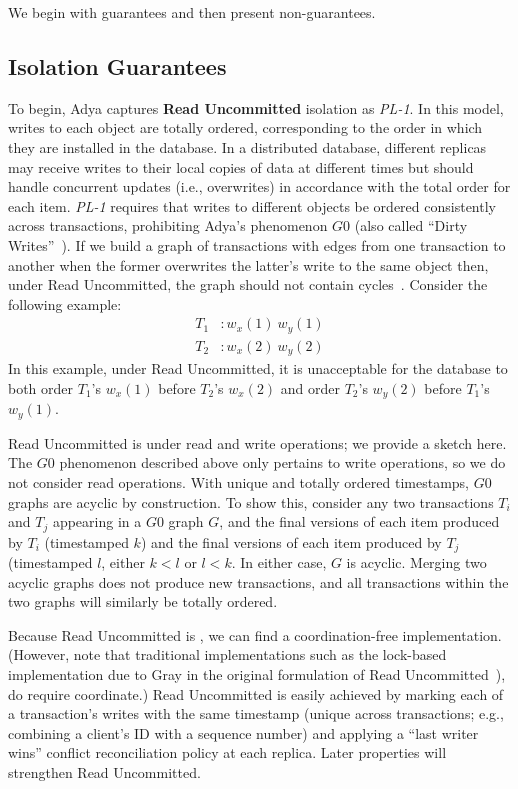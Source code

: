 We begin with \iconfluent guarantees and then present non-\iconfluent guarantees.

\subsection{\IConfluent Isolation Guarantees}
\label{sec:isolation}

To begin, Adya captures \textbf{Read Uncommitted} isolation as
\textit{PL-1}. In this model, writes to each object are totally
ordered, corresponding to the order in which they are installed in the
database. In a distributed database, different replicas may receive
writes to their local copies of data at different times but should
handle concurrent updates (i.e., overwrites) in accordance with the
total order for each item. \textit{PL-1} requires that writes to
different objects be ordered consistently across transactions,
prohibiting Adya's phenomenon $G0$ (also called ``Dirty
Writes''~\cite{ansicritique}). If we build a graph of transactions
with edges from one transaction to another when the former
overwrites the latter's write to the same object then, under Read
Uncommitted, the graph should not contain cycles~\cite{adya}. Consider
the following example:
\begin{align*}
T_1 &: w_x(1)~w_y(1)
\\T_2 &: w_x(2)~w_y(2)
\end{align*}
In this example, under Read Uncommitted, it is unacceptable for the
database to both order $T_1$'s $w_x(1)$ before $T_2$'s $w_x(2)$ and order
$T_2$'s $w_y(2)$ before $T_1$'s $w_y(1)$. 

Read Uncommitted is \iconfluent under read and write operations; we
provide a sketch here. The $G0$ phenomenon described above only pertains to
write operations, so we do not consider read operations. With unique
and totally ordered timestamps, $G0$ graphs are acyclic by
construction. To show this, consider any two transactions $T_i$ and
$T_j$ appearing in a $G0$ graph $G$, and the final versions of each
item produced by $T_i$ (timestamped $k$) and the final versions of
each item produced by $T_j$ (timestamped $l$, either $k < l$ or $l <
k$. In either case, $G$ is acyclic. Merging two acyclic graphs does
not produce new transactions, and all transactions within the two
graphs will similarly be totally ordered.

Because Read Uncommitted is \iconfluent, we can find a
coordination-free implementation. (However, note that traditional
implementations such as the lock-based implementation due to Gray in
the original formulation of Read Uncommitted~\cite{gray-isolation}),
do require coordinate.) Read Uncommitted is easily achieved by marking
each of a transaction's writes with the same timestamp (unique across
transactions; e.g., combining a client's ID with a sequence number)
and applying a ``last writer wins'' conflict reconciliation policy at
each replica. Later properties will strengthen Read Uncommitted.

